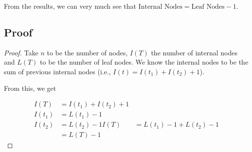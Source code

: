 \documentclass[12pt]{scrartcl}
\begin{document}
From the results, we can very much see that $\text{Internal Nodes} = \text{Leaf Nodes} - 1$.

\subsection{Proof}
\begin{proof}
    Take $n$ to be the number of nodes, $I(T)$ the number of internal nodes and $L(T)$ to be the number of leaf nodes. We know the internal nodes to be the sum of previous internal nodes (i.e., $I(t) = I(t_1) + I(t_2) + 1$).

    From this, we get

    \begin{align}
        I(T) &= I(t_1) + I(t_2) + 1 \\
        I(t_1) &= L(t_1) - 1 \\
        I(t_2) &= L(t_2) - 1
        I(T) &= L(t_1) - 1 + L(t_2) - 1 \\
             &= L(T) - 1
    \end{align}
\end{proof}
\end{document}

